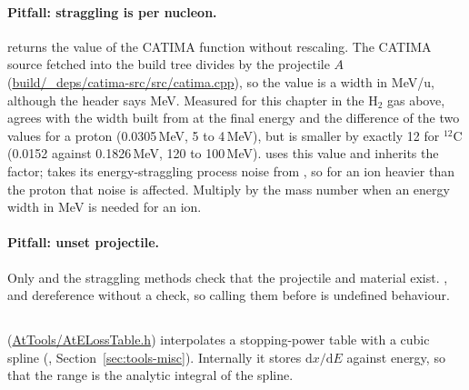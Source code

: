 \paragraph{Pitfall: straggling is per nucleon.}
 returns the value of the CATIMA function  without
rescaling. The CATIMA source fetched into the build tree divides by the projectile $A$
(\url{build/_deps/catima-src/src/catima.cpp}), so the value is a width in MeV/u, although the header says MeV. Measured for this chapter in the H$_2$ gas above,  agrees with
the width built from  at the final energy and the difference of the two
 values for a proton (0.0305\,MeV, 5 to 4\,MeV), but
is smaller by exactly 12 for $^{12}$C (0.0152 against 0.1826\,MeV, 120 to 100\,MeV).  uses this
value and inherits the factor;  takes its energy-straggling process noise from
, so for an ion heavier than the proton that noise is affected. Multiply by the mass number when
an energy width in MeV is needed for an ion.

\paragraph{Pitfall: unset projectile.}
Only  and the straggling methods check that the projectile and material exist. ,
 and  dereference  without a check, so calling them before
 is undefined behaviour.

\subsection{}

 (\url{AtTools/AtELossTable.h}) interpolates a stopping-power table with a cubic spline
(, Section~\ref{sec:tools-misc}). Internally it stores $\mathrm{d}x/\mathrm{d}E$ against energy, so
that the range is the analytic integral of the spline.

